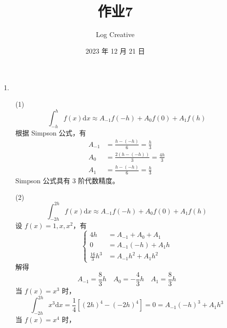 \documentclass{sjtuarticle}
\title{作业7}
\author{Log Creative}
\date{2023 年 12 月 21 日}
\def\dd{\mathrm{d}}
\begin{document}
\maketitle


\begin{itemize}
    \item[1.] \begin{solution}
    \begin{itemize}
        \item[(1)]
        \begin{equation*}
            \int_{-h}^h f(x)\dd x\approx A_{-1}f(-h)+A_0f(0)+A_1f(h)
        \end{equation*}
        根据 Simpson 公式，有
        \begin{align*}
            A_{-1} &= \frac{h-(-h)}{6} =\frac{h}{3} \\
            A_0 &= \frac{2(h-(-h))}{3} = \frac{4h}{3} \\
            A_1 &= \frac{h-(-h)}{6} = \frac{h}{3}
        \end{align*}
        Simpson 公式具有 3 阶代数精度。
        \item[(2)]
        \begin{equation*}
            \int_{-2h}^{2h}f(x)\dd x\approx A_{-1}f(-h)+A_0f(0)+A_1f(h)
        \end{equation*}
        设 $f(x)=1,x,x^2$，有
        \begin{equation*}
            \left\{
                \begin{aligned}
                4h &= A_{-1}+A_0+A_1 \\
                0 &= A_{-1}(-h)+A_1h \\
                \frac{16}{3}h^3 &= A_{-1}h^2+A_1h^2
                \end{aligned}
            \right.
        \end{equation*}
        解得
        \begin{equation*}
            A_{-1}=\frac{8}{3}h \quad A_0 = -\frac{4}{3}h \quad A_1 = \frac{8}{3}h
        \end{equation*}
        当 $f(x)=x^3$ 时，
        \begin{equation*}
            \int_{-2h}^{2h}x^3\dd x=\frac{1}{4}[(2h)^4-(-2h)^4]=0=A_{-1}(-h)^3+A_1h^3
        \end{equation*}
        当 $f(x)=x^4$ 时，
        \begin{equation*}

\end{equation*}
\end{itemize}
\end{solution}
\end{itemize}
\end{document}
